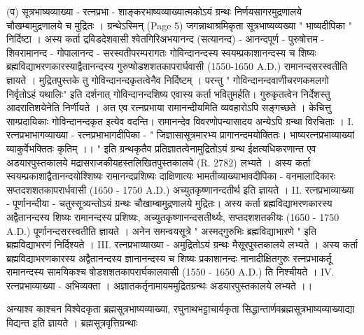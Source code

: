 (प) सूत्रभाष्यव्याख्या - रत्नप्रभा - 
शाङ्करभाष्यव्याख्यात्मकोऽयं ग्रन्थः निर्णयसागरमुद्रणालये चौखम्बामुद्रणालये च मुद्रितः । ग्रन्थेऽस्मिन् (Page 5) जगन्नाथाश्रमिकृता सूत्रभाष्यव्यख्या " भाष्यदीपिका " निर्दिष्टा । अस्य कर्ता द्रवि़डदेशवासी श्वेतगिरिअभयानन्द (सत्यानन्द) - आनन्दपूर्ण - पुरुषोत्तम - शिवरामानन्द - गोपालानन्द - सरस्वतीपरम्परागतः गोविन्दानन्दस्य स्वयम्प्रकाशानन्दस्य च शिष्यः ब्रह्मविद्याभरणकारस्याद्वैतानन्दस्य गुरुप्षोडशशतकापरार्घवासी (1550-1650 A.D.) रामानन्दसरस्वतीति ज्ञायते । मुद्रितपुस्तके तु गोविन्दानन्दकृतत्वेनैव निर्दिष्टम् । परन्तु " गोविन्दानन्दवाणीचरणकमलगो निर्वृतोऽहं यथालिः" इति दर्शनात् गोविन्दानन्दशिष्य एवास्य कर्ता भवितुमर्हति। गुरुकृतत्वेन निर्देशस्तु आदरातिशयेनेति निर्णीयते । अत एव रत्नप्रभाया रामानन्दीयमिति व्यवहारोऽपि सङ्गच्छते । केचित्तु साम्प्रदायिकाः गोविन्दानन्दकृत इत्येव वदन्ति। रामानन्देव विवरणोपन्यासादय अन्येऽपि ग्रन्था विरचिताः । 
I. रत्नप्रभाभागव्याख्या - रत्नप्रभाभागदीपिका -
" जिज्ञासासूत्रमारभ्य प्रागानन्दमयोक्तितः। भाष्यरत्नप्रभाव्याख्यां व्याकुर्वेभक्तितः कृतिम् ।। " इति ग्रन्थकृतैव प्रतिज्ञातत्वेनामुद्रितोऽयं ग्रन्थ ईक्षत्यधिकरणान्त एव अडयारपुस्तकालये मद्रासराजकीयहस्तलिखितपुस्तकालये (R. 2782) लभ्यते । अस्य कर्ता स्वयम्प्रकाशाद्वैतानन्दयोश्शिष्यः रामानन्दप्रशिष्यः दाक्षिणात्यः भामतीव्याख्याभावदीपिका - वनमालादिकारः सप्तदशशतकापरार्धवासी (1650 - 1750 A.D.) अच्युतकृष्णानन्दतीर्थ इति ज्ञायते । 
II. रत्नप्रभाव्याख्या - पूर्णानन्दीया -
चतुस्सूत्र्यन्तोऽयं ग्रन्थः चौखाम्बामुद्रणालये मुद्रितः। अस्य कर्ता ब्रह्मविद्याभरणकारस्य अद्वैतानन्दस्य शिष्यः रामानन्दस्य प्रशिष्यः, अच्युतकृष्णानन्दसतीर्थ्यः, सप्तदशशतकीयः (1650 - 1750 A.D.) पूर्णानन्दसरस्वतीति ज्ञायते । अनेन समन्वयसूत्रे " अस्मद्गुरुभिः ब्रह्मविद्याभारणे " इति ब्रह्मविद्याभरणं निर्दिश्यते । 
III.  रत्नप्रभाव्याख्या -
अमुद्रितोऽयं ग्रन्थः मैसूरपुस्तकालये लभ्यते । अस्य कर्ता ब्रह्मविद्याभरणकारस्य अद्वैतानन्दस्य ज्ञानानन्दस्य च शिष्यः प्रकाशानन्दः नानादीक्षितगुरुः रत्नप्रभाकर्तू रामानन्दस्य सामयिकश्च षोडशशतकापरार्घकालवासी (1550 - 1650 A.D.) ति निश्चीयते । 
IV. रत्नप्रभाव्याख्या - अभिव्यक्ता । अज्ञातकर्तृनामायममुद्रितग्रन्थः अडयारपुस्तकालये लभ्यते ।। 

अन्याश्व काश्चन विश्वेदकृता ब्रह्मसूत्रभाष्यव्याख्या, रघुनाथभट्टाचार्यकृता सिद्धान्तार्णवब्रह्मसूत्रभाष्यव्याख्याद्या विद्यन्त इति ज्ञायते । 
ब्रह्मसूत्रवृत्तिग्रन्थाः 

